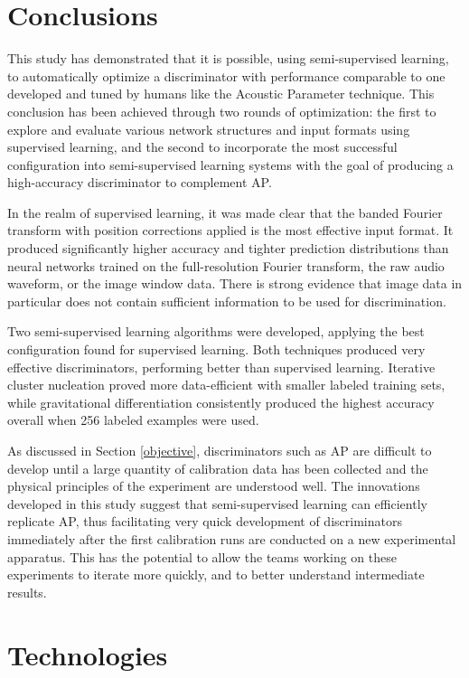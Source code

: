 \documentclass[10pt]{article}
\begin{document}
\section{Conclusions}

This study has demonstrated that it is possible, using semi-supervised learning, to automatically optimize a discriminator with performance comparable to one developed and tuned by humans like the Acoustic Parameter technique. This conclusion has been achieved through two rounds of optimization: the first to explore and evaluate various network structures and input formats using supervised learning, and the second to incorporate the most successful configuration into semi-supervised learning systems with the goal of producing a high-accuracy discriminator to complement AP.

In the realm of supervised learning, it was made clear that the banded Fourier transform with position corrections applied is the most effective input format. It produced significantly higher accuracy and tighter prediction distributions than neural networks trained on the full-resolution Fourier transform, the raw audio waveform, or the image window data. There is strong evidence that image data in particular does not contain sufficient information to be used for discrimination.

Two semi-supervised learning algorithms were developed, applying the best configuration found for supervised learning. Both techniques produced very effective discriminators, performing better than supervised learning. Iterative cluster nucleation proved more data-efficient with smaller labeled training sets, while gravitational differentiation consistently produced the highest accuracy overall when 256 labeled examples were used.

As discussed in Section \ref{objective}, discriminators such as AP are difficult to develop until a large quantity of calibration data has been collected and the physical principles of the experiment are understood well. The innovations developed in this study suggest that semi-supervised learning can efficiently replicate AP, thus facilitating very quick development of discriminators immediately after the first calibration runs are conducted on a new experimental apparatus. This has the potential to allow the teams working on these experiments to iterate more quickly, and to better understand intermediate results.

\section{Technologies}
\end{document}
